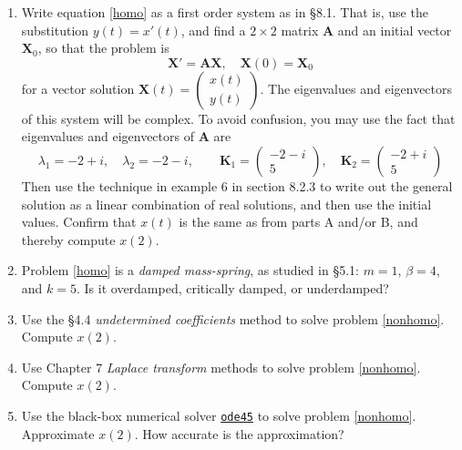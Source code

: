 \documentclass[12pt]{article}
\theoremstyle{definition}
\begin{document}
\begin{enumerate}
\item Write equation \eqref{homo} as a first order system as in \S8.1.  That is, use the substitution $y(t)=x'(t)$, and find a $2\times 2$ matrix $\mathbf{A}$ and an initial vector $\mathbf{X}_0$, so that the problem is
    $$\mathbf{X}' = \mathbf{A} \mathbf{X}, \quad \mathbf{X}(0)=\mathbf{X}_0$$
for a vector solution $\mathbf{X}(t) = \begin{pmatrix} x(t) \\ y(t) \end{pmatrix}$.  The eigenvalues and eigenvectors of this system will be complex.  To avoid confusion, you may use the fact that eigenvalues and eigenvectors of $\mathbf{A}$ are
    $$\lambda_1 = -2+i, \quad \lambda_2=-2-i, \qquad \mathbf{K}_1 = \begin{pmatrix} -2-i \\ 5 \end{pmatrix}, \quad \mathbf{K}_2 = \begin{pmatrix} -2+i \\ 5 \end{pmatrix}$$
Then use the technique in example 6 in section 8.2.3 to write out the general solution as a linear combination of real solutions, and then use the initial values.  Confirm that $x(t)$ is the same as from parts A and/or B, and thereby compute $x(2)$.
\item Problem \eqref{homo} is a \emph{damped mass-spring}, as studied in \S5.1: $m=1$, $\beta=4$, and $k=5$.  Is it overdamped, critically damped, or underdamped?
\item Use the \S4.4 \emph{undetermined coefficients} method to solve problem \eqref{nonhomo}.  Compute $x(2)$.
\item Use Chapter 7 \emph{Laplace transform} methods to solve problem \eqref{nonhomo}.  Compute $x(2)$.
\item Use the black-box numerical solver \href{https://www.mathworks.com/help/matlab/ref/ode45.html}{\texttt{ode45}} to solve problem \eqref{nonhomo}.  Approximate $x(2)$.  How accurate is the approximation?
\end{enumerate}
\end{document}
